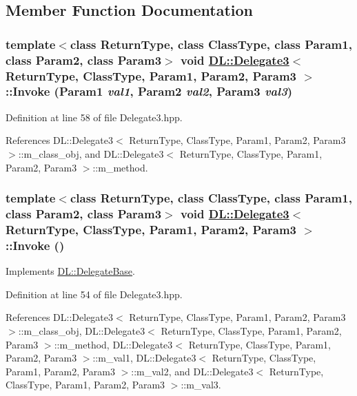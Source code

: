 \subsection{Member Function Documentation}
\hypertarget{classDL_1_1Delegate3_a3}{
\subsubsection[Invoke]{\setlength{\rightskip}{0pt plus 5cm}template$<$class Return\-Type, class Class\-Type, class Param1, class Param2, class Param3$>$ void \hyperlink{classDL_1_1Delegate3}{DL::Delegate3}$<$ Return\-Type, Class\-Type, Param1, Param2, Param3 $>$::Invoke (Param1 {\em val1}, Param2 {\em val2}, Param3 {\em val3})}}
\label{classDL_1_1Delegate3_a3}




Definition at line 58 of file Delegate3.hpp.

References DL::Delegate3$<$ Return\-Type, Class\-Type, Param1, Param2, Param3 $>$::m\_\-class\_\-obj, and DL::Delegate3$<$ Return\-Type, Class\-Type, Param1, Param2, Param3 $>$::m\_\-method.\hypertarget{classDL_1_1Delegate3_a2}{
\subsubsection[Invoke]{\setlength{\rightskip}{0pt plus 5cm}template$<$class Return\-Type, class Class\-Type, class Param1, class Param2, class Param3$>$ void \hyperlink{classDL_1_1Delegate3}{DL::Delegate3}$<$ Return\-Type, Class\-Type, Param1, Param2, Param3 $>$::Invoke ()}}
\label{classDL_1_1Delegate3_a2}




Implements \hyperlink{classDL_1_1DelegateBase_a2}{DL::Delegate\-Base}.

Definition at line 54 of file Delegate3.hpp.

References DL::Delegate3$<$ Return\-Type, Class\-Type, Param1, Param2, Param3 $>$::m\_\-class\_\-obj, DL::Delegate3$<$ Return\-Type, Class\-Type, Param1, Param2, Param3 $>$::m\_\-method, DL::Delegate3$<$ Return\-Type, Class\-Type, Param1, Param2, Param3 $>$::m\_\-val1, DL::Delegate3$<$ Return\-Type, Class\-Type, Param1, Param2, Param3 $>$::m\_\-val2, and DL::Delegate3$<$ Return\-Type, Class\-Type, Param1, Param2, Param3 $>$::m\_\-val3.

